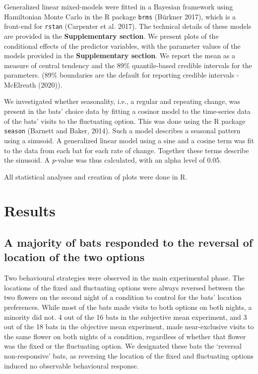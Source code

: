 \documentclass[
]{article}
\begin{document}
Generalized linear mixed-models were fitted in a Bayesian framework using Hamiltonian Monte Carlo in the R package \texttt{brms} (Bürkner 2017), which is a front-end for \texttt{rstan} (Carpenter et al. 2017). The technical details of these models are provided in the \textbf{Supplementary section}. We present plots of the conditional effects of the predictor variables, with the parameter values of the models provided in the \textbf{Supplementary section}. We report the mean as a measure of central tendency and the 89\% quantile-based credible intervals for the parameters. (89\% boundaries are the default for reporting credible intervals - McElreath (2020)).

We investigated whether seasonality, i.e., a regular and repeating change, was present in the bats' choice data by fitting a cosinor model to the time-series data of the bats' visits to the fluctuating option. This was done using the R package \texttt{season} (Barnett and Baker, 2014). Such a model describes a seasonal pattern using a sinusoid. A generalized linear model using a sine and a cosine term was fit to the data from each bat for each rate of change. Together these terms describe the sinusoid. A \emph{p}-value was thus calculated, with an alpha level of 0.05.

All statistical analyses and creation of plots were done in R.

\hypertarget{results}{%
\section{Results}\label{results}}

\hypertarget{a-majority-of-bats-responded-to-the-reversal-of-location-of-the-two-options}{%
\subsection{A majority of bats responded to the reversal of location of the two options}\label{a-majority-of-bats-responded-to-the-reversal-of-location-of-the-two-options}}

Two behavioural strategies were observed in the main experimental phase. The locations of the fixed and fluctuating options were always reversed between the two flowers on the second night of a condition to control for the bats' location preferences. While most of the bats made visits to both options on both nights, a minority did not. 4 out of the 16 bats in the subjective mean experiment, and 3 out of the 18 bats in the objective mean experiment, made near-exclusive visits to the same flower on both nights of a condition, regardless of whether that flower was the fixed or the fluctuating option. We designated these bats the `reversal non-responsive' bats, as reversing the location of the fixed and fluctuating options induced no observable behavioural response.
\end{document}
